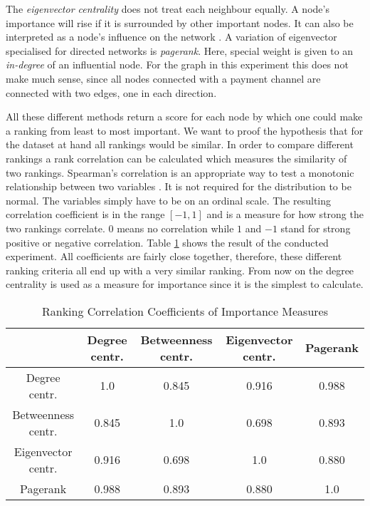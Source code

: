 \documentclass[final]{fhnwreport}       %
\begin{document}
The \emph{eigenvector centrality} does not treat each neighbour equally. A node's importance will rise if it is surrounded by other important nodes. It can also be interpreted as a node's influence on the network \citep{golbeck_analyzing_2013}. A variation of eigenvector specialised for directed networks is \emph{pagerank}. Here, special weight is given to an \emph{in-degree} of an influential node. For the graph in this experiment this does not make much sense, since all nodes connected with a payment channel are connected with two edges, one in each direction.

All these different methods return a score for each node by which one could make a ranking from least to most important. We want to proof the hypothesis that for the dataset at hand all rankings would be similar. In order to compare different rankings a rank correlation can be calculated which measures the similarity of two rankings. Spearman's correlation is an appropriate way to test a monotonic relationship between two variables \citep{noauthor_spearmans_nodate}. It is not required for the distribution to be normal. The variables simply have to be on an ordinal scale. The resulting correlation coefficient is in the range $[-1,1]$ and is a measure for how strong the two rankings correlate. $0$ means no correlation while $1$ and $-1$ stand for strong positive or negative correlation. Table \ref{tab:spearman} shows the result of the conducted experiment. All coefficients are fairly close together, therefore, these different ranking criteria all end up with a very similar ranking. From now on the degree centrality is used as a measure for importance since it is the simplest to calculate.

\begin{table}[H]
\centering
\begin{tabular}{c | cccc} 
{} & {Degree centr.} & {Betweenness centr.} & {Eigenvector centr.} & {Pagerank} \\ \hline 
{Degree centr.} & {1.0} & {0.845} & {0.916} & {0.988} \\ 
{Betweenness centr.} & {0.845} & {1.0} & {0.698} & {0.893}\\
{Eigenvector centr.} & {0.916} & {0.698} & {1.0} & {0.880} \\
{Pagerank} & {0.988} & {0.893} & {0.880} & {1.0} \\
\end{tabular}
\caption{Ranking Correlation Coefficients of Importance Measures}
\label{tab:spearman}
\end{table}
\end{document}
